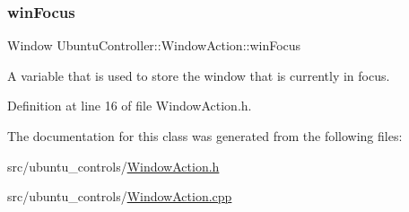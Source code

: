 \subsubsection{\texorpdfstring{win\+Focus}{winFocus}}
{\footnotesize\ttfamily Window Ubuntu\+Controller\+::\+Window\+Action\+::win\+Focus\hspace{0.3cm}{\ttfamily [private]}}



A variable that is used to store the window that is currently in focus. 



Definition at line 16 of file Window\+Action.\+h.



The documentation for this class was generated from the following files\+:\begin{DoxyCompactItemize}
\item 
src/ubuntu\+\_\+controls/\hyperlink{_window_action_8h}{Window\+Action.\+h}\item 
src/ubuntu\+\_\+controls/\hyperlink{_window_action_8cpp}{Window\+Action.\+cpp}\end{DoxyCompactItemize}
